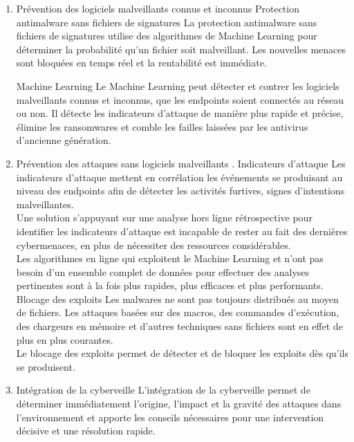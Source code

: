 \begin{enumerate}
 

 \item  Prévention des logiciels malveillants connus et inconnus
 Protection antimalware sans fichiers de signatures
 La protection antimalware sans fichiers de signatures utilise des algorithmes de Machine Learning pour déterminer la probabilité qu’un fichier soit malveillant. Les nouvelles menaces sont bloquées en temps réel et la rentabilité est immédiate.
 
  Machine Learning
 Le Machine Learning peut détecter et contrer les logiciels malveillants connus et inconnus, que les endpoints soient connectés au réseau ou non. Il détecte les indicateurs d’attaque de manière plus rapide et précise, élimine les ransomwares et comble les failles laissées par les antivirus d’ancienne génération.
 
\item  Prévention des attaques sans logiciels malveillants
 . Indicateurs d’attaque
 Les indicateurs d’attaque mettent en corrélation les événements se produisant au niveau des endpoints afin de détecter les activités furtives, signes d’intentions malveillantes.\\ 
 Une solution s’appuyant sur une analyse hors ligne rétrospective pour identifier les indicateurs d’attaque est incapable de rester au fait des dernières cybermenaces, en plus de nécessiter des ressources considérables.\\
  Les algorithmes en ligne qui exploitent le Machine Learning et n’ont pas besoin d’un ensemble complet de données pour effectuer des analyses pertinentes sont à la fois plus rapides, plus efficaces et plus performants.\\
 
  Blocage des exploits
 Les malwares ne sont pas toujours distribués au moyen de fichiers. Les attaques basées sur des macros, des commandes d’exécution, des chargeurs en mémoire et d’autres techniques sans fichiers sont en effet de plus en plus courantes.\\
  Le blocage des exploits permet de détecter et de bloquer les exploits dès qu’ils se produisent.\\
 
 \item Intégration de la cyberveille
 L’intégration de la cyberveille permet de déterminer immédiatement l’origine, l’impact et la gravité des attaques dans l’environnement et apporte les conseils nécessaires pour une intervention décisive et une résolution rapide.\\
 

\end{enumerate}
